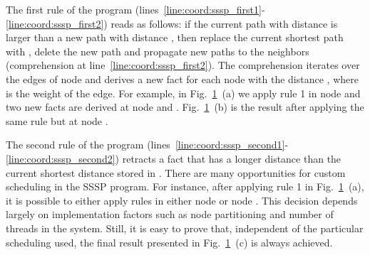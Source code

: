 \begin{figure}
\begin{center}
\begin{subfigure}[b]{0.49\textwidth}
      \mycap{}
   \end{subfigure}
\end{center}


\label{fig:shortest_path_program}
\end{figure}

The first rule of the program
(lines~\ref{line:coord:sssp_first1}-\ref{line:coord:sssp_first2}) reads as
follows: if the current  path  with distance 
is larger than a new path  with distance , then replace the
current shortest path with , delete the new  path and
propagate new paths to the neighbors (comprehension at
line~\ref{line:coord:sssp_first2}). The comprehension iterates over the edges of
node  and derives a new  fact for each node  with
the distance , where  is the weight of the edge. For
example, in Fig.~\ref{fig:shortest_path_program}~(a) we apply rule 1 in node
 and two new  facts are derived at node  and
.  Fig.~\ref{fig:shortest_path_program}~(b) is the result after
applying the same rule but at node .

The second rule of the program
(lines~\ref{line:coord:sssp_second1}-\ref{line:coord:sssp_second2}) retracts a
 fact that has a longer distance than the current shortest distance
stored in . There are many opportunities for custom scheduling
in the SSSP program. For instance, after applying rule 1 in
Fig.~\ref{fig:shortest_path_program}~(a), it is possible to either apply rules
in either node  or node .  This decision depends largely on
implementation factors such as node partitioning and number of threads in the
system. Still, it is easy to prove that, independent of the particular scheduling used, the final
result presented in Fig.~\ref{fig:shortest_path_program}~(c) is always achieved.

